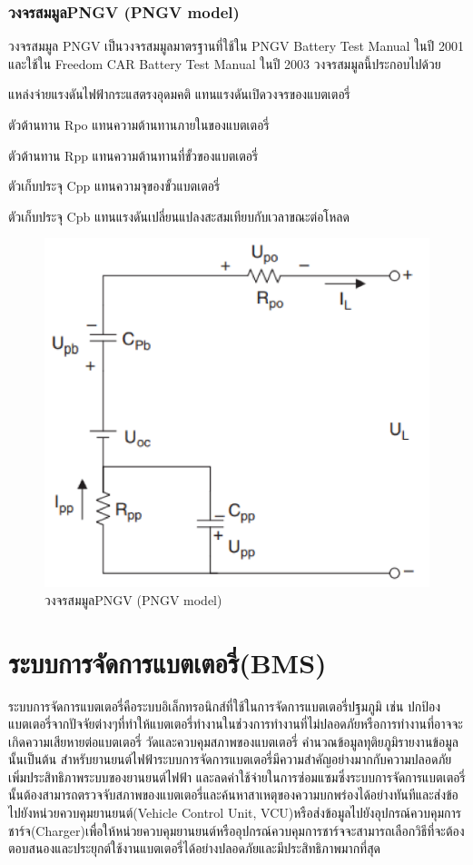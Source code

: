 \subsubsection*{วงจรสมมูลPNGV (PNGV model)}
วงจรสมมูล PNGV เป็นวงจรสมมูลมาตรฐานที่ใช้ใน PNGV Battery Test Manual ในปี 2001 และใช้ใน Freedom CAR Battery Test Manual
 ในปี 2003 วงจรสมมูลนี้ประกอบไปด้วย
\begin{itemize}
	{\item 	แหล่งจ่ายแรงดันไฟฟ้ากระแสตรงอุดมคติ แทนแรงดันเปิดวงจรของแบตเตอรี่}
	{\item 	ตัวต้านทาน Rpo แทนความต้านทานภายในของแบตเตอรี่}
	{\item 	ตัวต้านทาน Rpp แทนความต้านทานที่ขั้วของแบตเตอรี่}
	{\item 	ตัวเก็บประจุ Cpp แทนความจุของขั้วแบตเตอรี่}
	{\item 	ตัวเก็บประจุ Cpb แทนแรงดันเปลี่ยนแปลงสะสมเทียบกับเวลาขณะต่อโหลด}
\end{itemize}
\begin{center}
	\begin{figure}[H]
		\includegraphics[width=0.6\linewidth]{Chapters/img/PNGV_model.png}
			\centering
			\captionsetup{justification=centering,margin=2cm}
			\caption{วงจรสมมูลPNGV (PNGV model)}
	\end{figure}
\end{center}
\section{ระบบการจัดการแบตเตอรี่(BMS)}
ระบบการจัดการแบตเตอรี่คือระบบอิเล็กทรอนิกส์ที่ใช้ในการจัดการแบตเตอรี่ปฐมภูมิ เช่น ปกป้องแบตเตอรี่จากปัจจัยต่างๆที่ทำให้แบตเตอรี่ทำงานในช่วงการทำงานที่ไม่ปลอดภัยหรือการทำงานที่อาจจะเกิดความเสียหายต่อแบตเตอรี่ 
วัดและควบคุมสภาพของแบตเตอรี่ คำนวณข้อมูลทุติยภูมิรายงานข้อมูลนั้นเป็นต้น
สำหรับยานยนต์ไฟฟ้าระบบการจัดการแบตเตอรี่มีความสำคัญอย่างมากกับความปลอดภัย เพิ่มประสิทธิภาพระบบของยานยนต์ไฟฟ้า และลดค่าใช้จ่ายในการซ่อมแซมซึ่งระบบการจัดการแบตเตอรี่นั้นต้องสามารถตรวจจับสภาพของแบตเตอรี่และค้นหาสาเหตุของความบกพร่องได้อย่างทันทีและส่งข้อไปยังหน่วยควบคุมยานยนต์(Vehicle Control Unit, VCU)หรือส่งข้อมูลไปยังอุปกรณ์ควบคุมการชาร์จ(Charger)เพื่อให้หน่วยควบคุมยานยนต์หรืออุปกรณ์ควบคุมการชาร์จจะสามารถเลือกวิธีที่จะต้องตอบสนองและประยุกต์ใช้งานแบตเตอรี่ได้อย่างปลอดภัยและมีประสิทธิภาพมากที่สุด\newline
